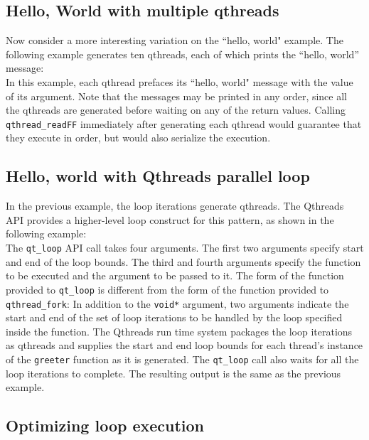 \documentclass[12pt]{article}
\begin{document}
\subsection{Hello, World with multiple qthreads}

Now consider a more interesting variation on the ``hello, world" example.  The following example generates ten qthreads, each of which prints the ``hello, world'' message:
\\


In this example, each qthread prefaces its ``hello, world" message with the value of its argument.  Note that the messages may be printed in any order, since all the qthreads are generated before waiting on any of the return values.  Calling {\tt qthread\_readFF} immediately after generating each qthread would guarantee that they execute in order, but would also serialize the execution.

\subsection{Hello, world with Qthreads parallel loop}

In the previous example, the loop iterations generate qthreads.  The Qthreads API provides a higher-level loop construct for this pattern, as shown in the following example:
\\


The {\tt qt\_loop} API call takes four arguments.  The first two arguments specify start and end of the loop bounds.  The third and fourth arguments specify the function to be executed and the argument to be passed to it.  The form of the function provided to {\tt qt\_loop} is different from the form of the function provided to {\tt qthread\_fork}:  In addition to the {\tt void*} argument, two arguments indicate the start and end of the set of loop iterations to be handled by the loop specified inside the function.  The Qthreads run time system packages the loop iterations as qthreads and supplies the start and end loop bounds for each thread's instance of the {\tt greeter} function as it is generated.  The {\tt qt\_loop} call also waits for all the loop iterations to complete.  The resulting output is the same as the previous example.

\subsection{Optimizing loop execution}
\end{document}
